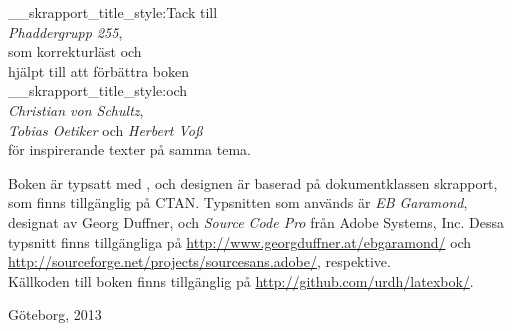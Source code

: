 \documentclass[lang=sv,ptsize=10pt,font=none,nomath,titles=bf,../../a4.tex]{subfiles}
\begin{document}
\pagestyle{empty}

\begin{titlepage} %
	\maketitle[hide={date,email}]
	\begin{abstract}
		En inkomplett guide till att skriva och typsätta \LaTeX-dokument riktad
		till studenter på Chalmers Tekniska Högskola, specifikt programmen
		Teknisk Matematik och Teknisk Fysik.
		Inspiration har tagits från bland annat
		\textcites{Schultz05}{Voss10},
		men främst från \textcite{Oetiker11}.
	\end{abstract}
\end{titlepage} %
\cleardoublepage

\begin{center} %
	\large\vspace*{36pt}

	{\csname__skrapport_title_style:\endcsname\Large Tack till}\\[1ex]
	\emph{Phaddergrupp 255},\\
	som korrekturläst och\\
	hjälpt till att förbättra boken\\[1ex]
	{\csname__skrapport_title_style:\endcsname\Large och}\\[1ex]
	\emph{Christian von Schultz},\\
	\emph{Tobias Oetiker} och \emph{Herbert Voß}\\
	för inspirerande texter på samma tema.
	\vfill 
	
	\small
	\begin{minipage}{\textwidth}
	\footnotesize
	Boken är typsatt med , och designen är baserad på 
	dokumentklassen \textsf{skrapport}, som finns tillgänglig på
	CTAN. Typsnitten som används är \emph{EB Garamond}, designat av
	Georg Duffner, och \emph{Source Code Pro} från Adobe Systems, 
	Inc. Dessa typsnitt finns tillgängliga på
	\url{http://www.georgduffner.at/ebgaramond/} och
	\url{http://sourceforge.net/projects/sourcesans.adobe/},
	respektive. \\
	Källkoden till boken finns tillgänglig på
	\url{http://github.com/urdh/latexbok/}.
	\end{minipage}

	\medskip
	Göteborg, 2013
\end{center}
\end{document}
